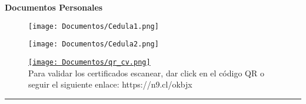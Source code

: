 \pagestyle{empty}
\begin{mainbar}
    \textbf{Documentos Personales}
\end{mainbar}


\setlength{\columnsep}{0.75cm}
\setlength{\columnseprule}{0pt}


\normalsize

\begin{paracol}{2}
\begin{leftcolumn}
\begin{figure}[h]
    \centering
    \texttt{[image: Documentos/Cedula1.png]}
\end{figure}


\end{leftcolumn}

\begin{rightcolumn} 

\begin{figure}[h]
    \centering
    \texttt{[image: Documentos/Cedula2.png]}
\end{figure}


\end{rightcolumn}
\end{paracol}


\begin{figure}[h]
    \centering
    \href{https://puceseedu-my.sharepoint.com/:b:/g/personal/homero_j_velastegui_i_pucese_edu_ec/Ed01ebVfgyxCt_lZrprxfVQBDFxuOlYQafqRMlXky1HdYQ?e=j38trF}{\texttt{[image: Documentos/qr\_cv.png]}}
    \\Para validar los certificados escanear, dar click en el código QR o seguir el siguiente enlace: https://n9.cl/okbjx 
\end{figure}


\setlength{\parindent}{0pt}
\textcolor{lightcol}{ \rule{1.02\textwidth}{3pt} }